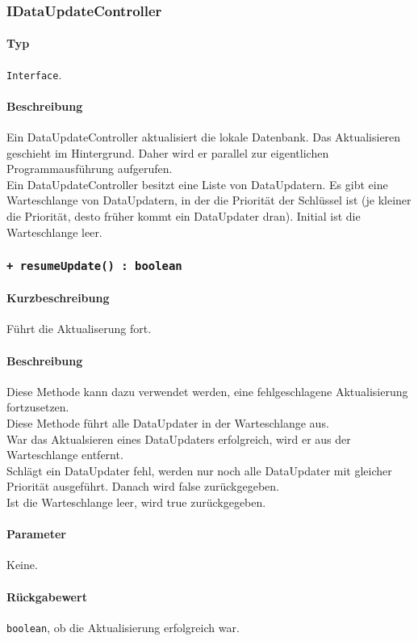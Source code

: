 \subsubsection{IDataUpdateController}
\paragraph*{Typ}
\texttt{Interface}.
\paragraph*{Beschreibung}
Ein DataUpdateController aktualisiert die lokale Datenbank. Das Aktualisieren geschieht im 
Hintergrund. Daher wird er parallel zur eigentlichen Programmausführung aufgerufen.\\
Ein DataUpdateController besitzt eine Liste von DataUpdatern.
Es gibt eine Warteschlange von DataUpdatern, in der die Priorität der Schlüssel ist (je kleiner 
die Priorität, desto früher kommt ein DataUpdater dran). Initial ist die Warteschlange leer.\\


\subsubsection*{\texttt{+ resumeUpdate() : boolean}}%
\paragraph*{Kurzbeschreibung}
Führt die Aktualiserung fort.
\paragraph*{Beschreibung}
Diese Methode kann dazu verwendet werden, eine fehlgeschlagene Aktualisierung fortzusetzen.\\
Diese Methode führt alle DataUpdater in der Warteschlange aus.\\
War das Aktualsieren eines DataUpdaters erfolgreich, wird er aus der Warteschlange entfernt.\\
Schlägt ein DataUpdater fehl, werden nur noch alle DataUpdater mit gleicher Priorität 
ausgeführt. Danach wird false zurückgegeben.\\
Ist die Warteschlange leer, wird true zurückgegeben.\\
\paragraph*{Parameter}
Keine.
\paragraph*{Rückgabewert}
\texttt{boolean}, ob die Aktualisierung erfolgreich war.

